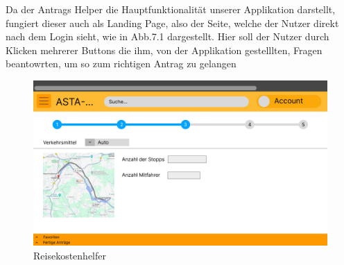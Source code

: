 Da der Antrags Helper die Hauptfunktionalität unserer Applikation darstellt, fungiert
dieser auch als Landing Page, also der Seite, welche der Nutzer direkt nach dem Login
sieht, wie in Abb.7.1 dargestellt. Hier soll der Nutzer durch Klicken mehrerer Buttons die
ihm, von der Applikation gestelllten, Fragen beantowrten, um so zum richtigen Antrag zu
gelangen

\begin{figure}[h]
  \centering
    \includegraphics[width=1.0\textwidth]{Doc/images/Reisekostenhelper.png}
    \caption{Reisekostenhelfer}
\end{figure}

